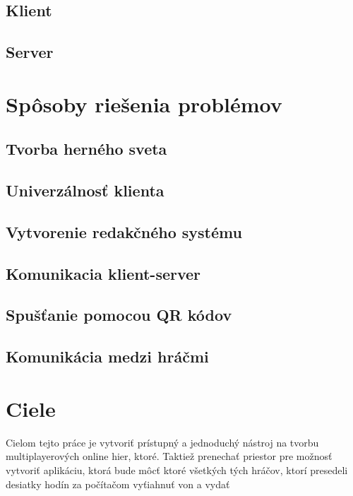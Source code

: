 \subsection{Klient}
\subsection{Server}


\section{Spôsoby riešenia problémov}
\subsection{Tvorba herného sveta}
\subsection{Univerzálnosť klienta}
\subsection{Vytvorenie redakčného systému}
\subsection{Komunikacia klient-server}
\subsection{Spušťanie pomocou QR kódov}
\subsection{Komunikácia medzi hráčmi}



\section{Ciele}
Cielom tejto práce je vytvoriť prístupný a jednoduchý nástroj na tvorbu multiplayerových online hier, ktoré. Taktiež prenechať priestor pre možnosť vytvoriť aplikáciu, ktorá bude môcť  ktoré všetkých tých hráčov, ktorí presedeli desiatky hodín za počítačom vyťiahnuť von a vydať
